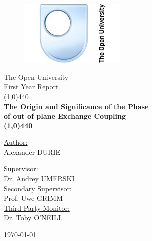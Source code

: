 \documentclass[a4paper, 12pt]{article}
\author{Alexander Durie}
\begin{document}
	\begin{titlepage}
		\begin{figure}[H]
			\centering
			\includegraphics[width=2in]{OU_logo.jpg}
		\end{figure}
		\begin{center}
			\vspace{2cm}
			\huge{The Open University}\\[1.5cm]
			\Large
			First Year Report\\[4mm]
			\linethickness{1pt}\line(1,0){440}
			\\
			\LARGE\bf The Origin and Significance of the Phase\\ of out of plane Exchange Coupling
			\\[-4mm]

			\line(1,0){440}
		\end{center}
		\begin{multicols}{2}
			\justify \underline{Author:}\\[1mm]
			\footnotesize Alexander DURIE\\[17mm]
			\begin{flushright}
				\normalsize\underline{Supervisor:}\\[1mm]
				\footnotesize{Dr. Andrey UMERSKI}\\[3mm]
				\normalsize\underline{Secondary Supervisor:}\\[1mm]
				\footnotesize Prof. Uwe GRIMM\\[3mm]
				\normalsize\underline{Third Party Monitor:}\\[1mm]
				\footnotesize Dr. Toby O'NEILL
			\end{flushright}
		\end{multicols}
		\vspace{5cm}
		\large\centering\today
	\end{titlepage}
	\newpage
	\tableofcontents

	\newpage
	\printglossaries
	\newpage
\end{document}
